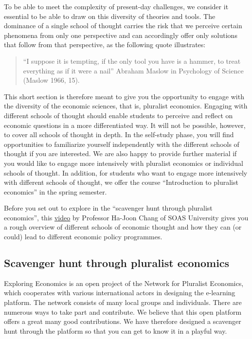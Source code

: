 \documentclass[
  british,
  a4paper,
  DIV=11,
  numbers=noendperiod,
  oneside,
  openany]{scrreprt}
\begin{document}
To be able to meet the complexity of present-day challenges, we consider
it essential to be able to draw on this diversity of theories and tools.
The dominance of a single school of thought carries the risk that we
perceive certain phenomena from only one perspective and can accordingly
offer only solutions that follow from that perspective, as the following
quote illustrates:

\begin{quote}
``I suppose it is tempting, if the only tool you have is a hammer, to
treat everything as if it were a nail'' Abraham Maslow in Psychology of
Science (Maslow 1966, 15).
\end{quote}

This short section is therefore meant to give you the opportunity to
engage with the diversity of the economic sciences, that is, pluralist
economics. Engaging with different schools of thought should enable
students to perceive and reflect on economic questions in a more
differentiated way. It will not be possible, however, to cover all
schools of thought in depth. In the self-study phase, you will find
opportunities to familiarize yourself independently with the different
schools of thought if you are interested. We are also happy to provide
further material if you would like to engage more intensively with
pluralist economics or individual schools of thought. In addition, for
students who want to engage more intensively with different schools of
thought, we offer the course ``Introduction to pluralist economics'' in
the spring semester.

Before you set out to explore in the ``scavenger hunt through pluralist
economics'', this
\href{https://www.youtube.com/watch?v=NdbbcO35arw}{video} by Professor
Ha-Joon Chang of SOAS University gives you a rough overview of different
schools of economic thought and how they can (or could) lead to
different economic policy programmes.

\subsection{Scavenger hunt through pluralist
economics}\label{scavenger-hunt-through-pluralist-economics}

Exploring Economics is an open project of the Network for Pluralist
Economics, which cooperates with various international actors in
designing the e-learning platform. The network consists of many local
groups and individuals. There are numerous ways to take part and
contribute. We believe that this open platform offers a great many good
contributions. We have therefore designed a scavenger hunt through the
platform so that you can get to know it in a playful way.
\end{document}
